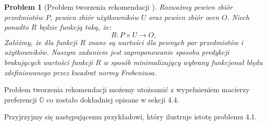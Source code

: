\documentclass[12pt,a4paper]{report}
\newtheorem{problem}{Problem}[chapter]
\newcommand{\setUzytkownicy}{\mathit{U}}
\newcommand{\setPrzedmioty}{\mathit{P}}
\newcommand{\setOceny}{\mathit{O}}
\begin{document}
\begin{problem}[Problem tworzenia rekomendacji {\citep[Sec 1.3]{kidzinski}}]
Rozważmy pewien zbiór przedmiotów $\setPrzedmioty$, pewien zbiór użytkowników $\setUzytkownicy$ oraz pewien zbiór ocen $\setOceny$. Niech ponadto $R$ będzie funkcją taką, że:
$$ 
R: \setPrzedmioty \times \setUzytkownicy \to \setOceny .
$$
Załóżmy, że dla funkcji $R$ znane są wartości dla pewnych par przedmiotów i użytkowników. Naszym zadaniem jest zaproponowanie sposobu predykcji brakujących wartości funkcji $R$ w sposób minimalizujący wybrany funkcjonał błędu zdefiniowanego przez kwadrat normy Frobeniusa. 
\end{problem}

Problem tworzenia rekomendacji możemy utożsamić z wypełnieniem macierzy preferencji $\mathbb{O}$ co zostało dokładniej opisane w sekcji 4.4.
\bigskip

Przyjrzyjmy się następującemu przykładowi, który ilustruje istotę problemu 4.1.
\end{document}
